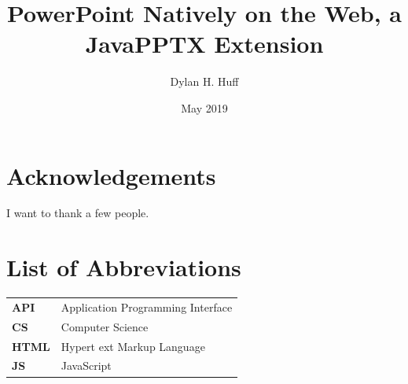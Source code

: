 \documentclass[12pt,twoside]{reedthesis}
\title{PowerPoint Natively on the Web, a JavaPPTX Extension}
\author{Dylan H. Huff}
\date{May 2019}
\begin{document}
  \maketitle
  \frontmatter %
  \pagestyle{empty} %

    \chapter*{Acknowledgements}
	I want to thank a few people.

	
	

    \chapter*{List of Abbreviations}
	\begin{table}[h]
	\centering %
	\begin{tabular}{ll}
		\textbf{API} & Application Programming Interface\\ 
		\textbf{CS}   & Computer Science\\
		\textbf{HTML} & Hypert	ext Markup Language\\
		\textbf{JS}  	&  JavaScript\\
	\end{tabular}
	\end{table}
	

    \tableofcontents
    \listoffigures

\end{document}
